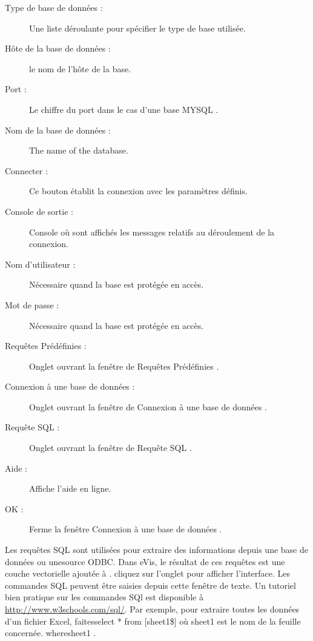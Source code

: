 \begin{description}
\item[Type de base de données :] Une liste déroulante pour spécifier le type de base utilisée.
\item[Hôte de la base de données :] le nom de l'hôte de la base.
\item[Port :] Le chiffre du port dans le cas d'une base MYSQL .
\item[Nom de la base de données :] The name of the database.
\item[Connecter :] Ce bouton établit la connexion avec les paramètres définis.
\item[Console de sortie :] Console où sont affichés les messages relatifs au déroulement de la connexion.
\item[Nom d'utilisateur :] Nécessaire quand la base est protégée en accès.
\item[Mot de passe :] Nécessaire quand la base est protégée en accès.
\item[Requêtes Prédéfinies :]  Onglet ouvrant la fenêtre de Requêtes Prédéfinies .
\item[Connexion à une base de données :] Onglet ouvrant la fenêtre de Connexion à une base de données .
\item[Requête SQL :] Onglet ouvrant la fenêtre de Requête SQL .
\item[Aide :] Affiche l'aide en ligne.
\item[OK :] Ferme la fenêtre Connexion à une base de données .
\end{description}

\label{evis_running_sql}


Les requêtes SQL sont utilisées pour extraire des informations depuis une base de données ou unesource ODBC. Dans eVis, le résultat de ces requêtes est une couche vectorielle ajoutée à \qg. cliquez sur l'onglet  pour afficher l'interface. Les commandes SQL peuvent être saisies depuis cette fenêtre de texte. Un tutoriel bien pratique sur les commandes SQl est disponible à \url{http://www.w3schools.com/sql/}. Par exemple, pour extraire toutes les données d'un fichier Excel, faitesselect * from [sheet1\$]  où sheet1  est le nom de la feuille concernée.
wheresheet1 .


